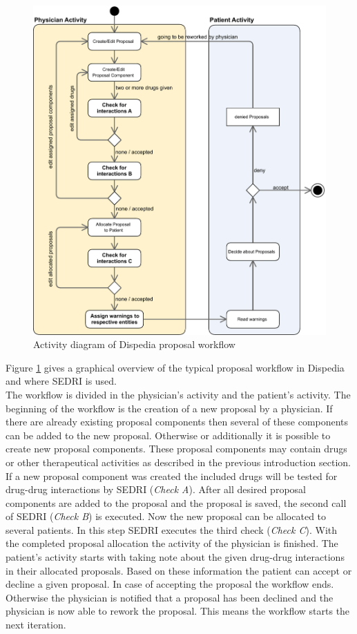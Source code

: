 \begin{figure}
  \centering
  \includegraphics[scale=0.49]{evaluation/Dispedia_Integration_activity}
  \caption{Activity diagram of Dispedia proposal workflow}
  \label{fig:dispedia_activity}
\end{figure}
Figure \ref{fig:dispedia_activity} gives a graphical overview of the typical proposal workflow in Dispedia and where SEDRI is used.\\
The workflow is divided in the physician's activity and the patient's activity.
The beginning of the workflow is the creation of a new proposal by a physician.
If there are already existing proposal components then several of these components can be added to the new proposal.
Otherwise or additionally it is possible to create new proposal components.
These proposal components may contain drugs or other therapeutical activities as described in the previous introduction section.
If a new proposal component was created the included drugs will be tested for drug-drug interactions by SEDRI (\textit{Check A}).
After all desired proposal components are added to the proposal and the proposal is saved, the second call of SEDRI (\textit{Check B}) is executed.
Now the new proposal can be allocated to several patients.
In this step SEDRI executes the third check (\textit{Check C}).
With the completed proposal allocation the activity of the physician is finished.
The patient's activity starts with taking note about the given drug-drug interactions in their allocated proposals.
Based on these information the patient can accept or decline a given proposal.
In case of accepting the proposal the workflow ends.
Otherwise the physician is notified that a proposal has been declined and the physician is now able to rework the proposal.
This means the workflow starts the next iteration.

